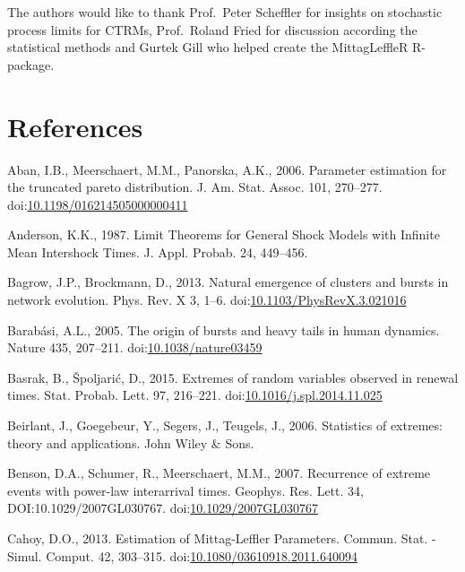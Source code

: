 \documentclass[]{elsarticle} %
\begin{document}
The authors would like to thank Prof.~Peter Scheffler for insights on
stochastic process limits for CTRMs, Prof.~Roland Fried for discussion
according the statistical methods and Gurtek Gill who helped create the
MittagLeffleR R-package.

\newpage

\hypertarget{references}{%
\section*{References}\label{references}}

\hypertarget{refs}{}
\leavevmode\hypertarget{ref-Aban06}{}%
Aban, I.B., Meerschaert, M.M., Panorska, A.K., 2006. Parameter
estimation for the truncated pareto distribution. J. Am. Stat. Assoc.
101, 270--277.
doi:\href{https://doi.org/10.1198/016214505000000411}{10.1198/016214505000000411}

\leavevmode\hypertarget{ref-Anderson1987}{}%
Anderson, K.K., 1987. Limit Theorems for General Shock Models with
Infinite Mean Intershock Times. J. Appl. Probab. 24, 449--456.

\leavevmode\hypertarget{ref-Bagrow2013}{}%
Bagrow, J.P., Brockmann, D., 2013. Natural emergence of clusters and
bursts in network evolution. Phys. Rev. X 3, 1--6.
doi:\href{https://doi.org/10.1103/PhysRevX.3.021016}{10.1103/PhysRevX.3.021016}

\leavevmode\hypertarget{ref-Barabasi2005}{}%
Barabási, A.L., 2005. The origin of bursts and heavy tails in human
dynamics. Nature 435, 207--211.
doi:\href{https://doi.org/10.1038/nature03459}{10.1038/nature03459}

\leavevmode\hypertarget{ref-Basrak2014}{}%
Basrak, B., Špoljarić, D., 2015. Extremes of random variables observed
in renewal times. Stat. Probab. Lett. 97, 216--221.
doi:\href{https://doi.org/10.1016/j.spl.2014.11.025}{10.1016/j.spl.2014.11.025}

\leavevmode\hypertarget{ref-beirlantBook}{}%
Beirlant, J., Goegebeur, Y., Segers, J., Teugels, J., 2006. Statistics
of extremes: theory and applications. John Wiley \& Sons.

\leavevmode\hypertarget{ref-Benson2007}{}%
Benson, D.A., Schumer, R., Meerschaert, M.M., 2007. Recurrence of
extreme events with power-law interarrival times. Geophys. Res. Lett.
34, DOI:10.1029/2007GL030767.
doi:\href{https://doi.org/10.1029/2007GL030767}{10.1029/2007GL030767}

\leavevmode\hypertarget{ref-Cahoy2013}{}%
Cahoy, D.O., 2013. Estimation of Mittag-Leffler Parameters. Commun.
Stat. - Simul. Comput. 42, 303--315.
doi:\href{https://doi.org/10.1080/03610918.2011.640094}{10.1080/03610918.2011.640094}
\end{document}
